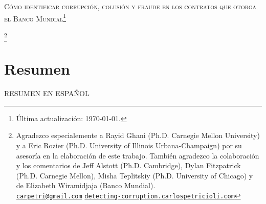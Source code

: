\thispagestyle{plain}
\begin{center}
\scshape \large Cómo identificar corrupción, colusión y fraude en los contratos que otorga el Banco Mundial\footnote{  Última actualización: \today.}
\bigskip

\scshape \theauthor\footnote{ Agradezco especialemente a Rayid Ghani (Ph.D. Carnegie Mellon University) y a  Eric Rozier (Ph.D. University of Illinois Urbana-Champaign) por su asesoría en la elaboración de este trabajo. También agradezco la colaboración y los comentarios de Jeff Alstott (Ph.D. Cambridge), Dylan Fitzpatrick (Ph.D. Carnegie Mellon), Misha Teplitskiy (Ph.D. University of Chicago) y de Elizabeth Wiramidjaja (Banco Mundial).
\\  \href{mailto:carpetri@gmail.com}{\texttt{carpetri@gmail.com}}  \hfill \href{http://detecting-corruption.carlospetricioli.com}{\texttt{detecting-corruption.carlospetricioli.com}} }
\normalsize
\end{center}

\section*{\centering  \normalsize{Resumen} }

\small

RESUMEN EN ESPAÑOL


